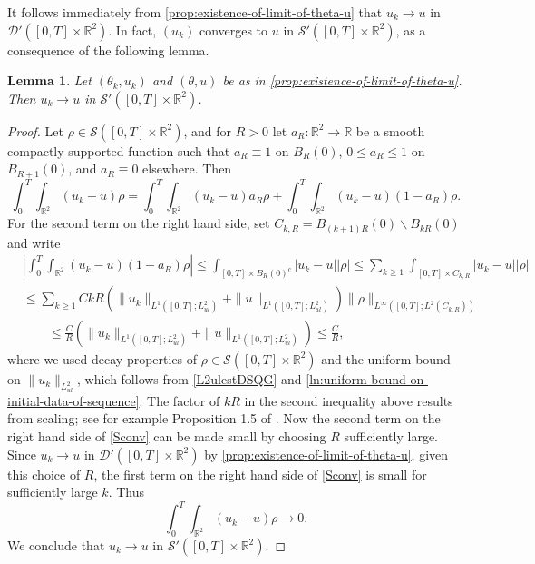 \documentclass[11pt,reqno,xcolor=svgnames]{amsart}
\def\R{{\mathbb R}}
\theoremstyle{plain}
\newtheorem{lemma}[theorem]{Lemma}
\theoremstyle{definition}
\theoremstyle{plain}
\theoremstyle{remark}
\begin{document}
It follows immediately from \cref{prop:existence-of-limit-of-theta-u} that $u_k\to u$ in $\mathcal{D}'([0,T]\times\R^2)$.  In fact, $(u_k)$ converges to $u$ in $\mathcal{S}'([0,T]\times \R^2)$, as a consequence of the following lemma.
\begin{lemma}\label{Sconvergence}
 Let $(\theta_k,u_k)$ and $(\theta,u)$ be as in \cref{prop:existence-of-limit-of-theta-u}.  Then $u_k\rightarrow u$ in $\mathcal{S}'([0,T]\times\R^2)$.
\end{lemma}
\begin{proof}
Let $\rho\in\mathcal{S}([0,T]\times\R^2)$, and for $R>0$ let $a_R:\R^2\rightarrow\R$ be a smooth compactly supported function such that $a_R \equiv 1$ on $B_R(0)$, $0\leq a_R \leq 1$ on $B_{R+1}(0)$, and $a_R \equiv 0$ elsewhere. Then
\begin{equation}\label{Sconv}
\int_0^T\int_{\R^2} (u_k - u)\rho  = \int_0^T\int_{\R^2} (u_k - u)a_R\rho  + \int_0^T\int_{\R^2} (u_k - u)(1-a_R)\rho. 
\end{equation}  
For the second term on the right hand side, set $C_{k,R}= B_{(k+1)R}(0)\backslash B_{kR}(0)$ and write
\begin{equation*}
\begin{split}
&\left |\int_0^T\int_{\R^2} (u_k - u)(1-a_R)\rho \right | \leq  \int_{[0,T]\times B_R(0)^c} |u_k - u||\rho|  \leq \sum_{k\geq 1} \int_{[0,T]\times C_{k,R}} |u_k - u||\rho|\\
&\leq \sum_{k\geq 1}CkR \left(\| u_k \|_{L^1([0,T];L^2_{ul})} + \|u \|_{L^1([0,T];L^2_{ul})}\right) \| \rho  \|_{L^{\infty}([0,T];L^2(C_{k,R}))}\\
&\qquad \leq \frac{C}{R} \left(\| u_k \|_{L^1([0,T];L^2_{ul})} + \|u \|_{L^1([0,T];L^2_{ul})}\right) \leq \frac{C}{R},
\end{split}
\end{equation*}
where we used decay properties of $\rho\in\mathcal{S}([0,T]\times\R^2)$ and the uniform bound on $\| u_k \|_{L^2_{ul}}$, which follows from \eqref{L2ulestDSQG} and \eqref{ln:uniform-bound-on-initial-data-of-sequence}.  The factor of $kR$ in the second inequality above results from scaling; see for example Proposition 1.5 of \cite{Taniuchi}.  Now the second term on the right hand side of \cref{Sconv} can be made small by choosing $R$ sufficiently large.  Since $u_k \rightarrow u$ in $\mathcal{D}'([0,T]\times\R^2)$ by \cref{prop:existence-of-limit-of-theta-u}, given this choice of $R$, the first term on the right hand side of \cref{Sconv} is small for sufficiently large $k$.  Thus
$$\int_0^T\int_{\R^2} (u_k - u)\rho  \rightarrow 0.$$   
We conclude that $u_k\rightarrow u$ in $\mathcal{S}'([0,T]\times\R^2)$.
\end{proof}
\end{document}
